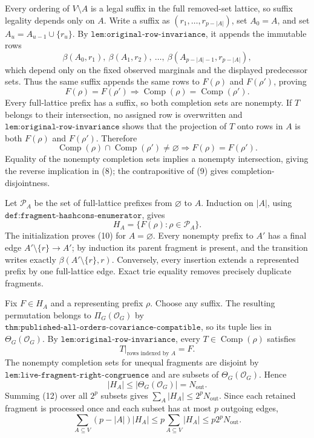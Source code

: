 Every ordering of \(V\setminus A\) is a legal suffix in the full removed-set lattice, so suffix legality depends only on \(A\).  Write a suffix as \((r_1,\ldots,r_{p-|A|})\), set \(A_0=A\), and set \(A_u=A_{u-1}\cup\{r_u\}\).  By \(\texttt{lem:original-row-invariance}\), it appends the immutable rows
\[
 \beta(A_0,r_1),\ \beta(A_1,r_2),\ \ldots,\
 \beta(A_{p-|A|-1},r_{p-|A|}),
 \tag{7}
\]
which depend only on the fixed observed marginals and the displayed predecessor sets.  Thus the same suffix appends the same rows to \(F(\rho)\) and \(F(\rho')\), proving
\[
 F(\rho)=F(\rho')
 \Longrightarrow
 \operatorname{Comp}(\rho)=\operatorname{Comp}(\rho').
 \tag{8}
\]
Every full-lattice prefix has a suffix, so both completion sets are nonempty.  If \(T\) belongs to their intersection, no assigned row is overwritten and \(\texttt{lem:original-row-invariance}\) shows that the projection of \(T\) onto rows in \(A\) is both \(F(\rho)\) and \(F(\rho')\).  Therefore
\[
 \operatorname{Comp}(\rho)\cap\operatorname{Comp}(\rho')\ne\varnothing
 \Longrightarrow F(\rho)=F(\rho').
 \tag{9}
\]
Equality of the nonempty completion sets implies a nonempty intersection, giving the reverse implication in (8); the contrapositive of (9) gives completion-disjointness.

Let \(\mathcal P_A\) be the set of full-lattice prefixes from \(\varnothing\) to \(A\).  Induction on \(|A|\), using \(\texttt{def:fragment-hashcons-enumerator}\), gives
\[
 H_A=\{F(\rho):\rho\in\mathcal P_A\}.
 \tag{10}
\]
The initialization proves (10) for \(A=\varnothing\).  Every nonempty prefix to \(A'\) has a final edge \(A'\setminus\{r\}\to A'\); by induction its parent fragment is present, and the transition writes exactly \(\beta(A'\setminus\{r\},r)\).  Conversely, every insertion extends a represented prefix by one full-lattice edge.  Exact trie equality removes precisely duplicate fragments.

Fix \(F\in H_A\) and a representing prefix \(\rho\).  Choose any suffix.  The resulting permutation belongs to \(\Pi_G(\mathcal O_G)\) by \(\texttt{thm:published-all-orders-covariance-compatible}\), so its tuple lies in \(\Theta_G(\mathcal O_G)\).  By \(\texttt{lem:original-row-invariance}\), every \(T\in\operatorname{Comp}(\rho)\) satisfies
\[
 T\big|_{\text{rows indexed by }A}=F.
 \tag{11}
\]
The nonempty completion sets for unequal fragments are disjoint by \(\texttt{lem:live-fragment-right-congruence}\) and are subsets of \(\Theta_G(\mathcal O_G)\).  Hence
\[
 |H_A|\le|\Theta_G(\mathcal O_G)|=N_{\mathrm{out}}.
 \tag{12}
\]
Summing (12) over all \(2^p\) subsets gives \(\sum_A|H_A|\le2^pN_{\mathrm{out}}\).  Since each retained fragment is processed once and each subset has at most \(p\) outgoing edges,
\[
 \sum_{A\subseteq V}(p-|A|)|H_A|
 \le p\sum_{A\subseteq V}|H_A|
 \le p2^pN_{\mathrm{out}}.
\]

